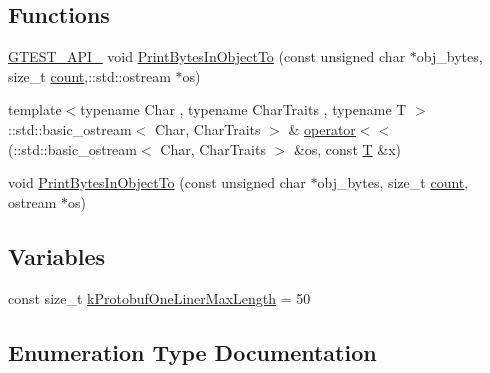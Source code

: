 \subsection*{Functions}
\begin{DoxyCompactItemize}
\item 
\hyperlink{gtest-port_8h_aa73be6f0ba4a7456180a94904ce17790}{G\+T\+E\+S\+T\+\_\+\+A\+P\+I\+\_\+} void \hyperlink{namespacetesting_1_1internal2_a04a384ee5de3a9f4f00a6052ea79b495}{Print\+Bytes\+In\+Object\+To} (const unsigned char $\ast$obj\+\_\+bytes, size\+\_\+t \hyperlink{gmock__stress__test_8cc_afd9db40e3361ae09188795e8cbe19752}{count},\+::std\+::ostream $\ast$os)
\item 
{\footnotesize template$<$typename Char , typename Char\+Traits , typename T $>$ }\\\+::std\+::basic\+\_\+ostream$<$ Char, Char\+Traits $>$ \& \hyperlink{namespacetesting_1_1internal2_a07dbe129beb8952074f04b599dfce39b}{operator$<$$<$} (\+::std\+::basic\+\_\+ostream$<$ Char, Char\+Traits $>$ \&os, const \hyperlink{functions__7_8js_adf1f3edb9115acb0a1e04209b7a9937b}{T} \&x)
\item 
void \hyperlink{namespacetesting_1_1internal2_abfb9aa80365f93b952e9a4bea09947a8}{Print\+Bytes\+In\+Object\+To} (const unsigned char $\ast$obj\+\_\+bytes, size\+\_\+t \hyperlink{gmock__stress__test_8cc_afd9db40e3361ae09188795e8cbe19752}{count}, ostream $\ast$os)
\end{DoxyCompactItemize}
\subsection*{Variables}
\begin{DoxyCompactItemize}
\item 
const size\+\_\+t \hyperlink{namespacetesting_1_1internal2_a140c8efd51e63a3def98445bff107518}{k\+Protobuf\+One\+Liner\+Max\+Length} = 50
\end{DoxyCompactItemize}


\subsection{Enumeration Type Documentation}
